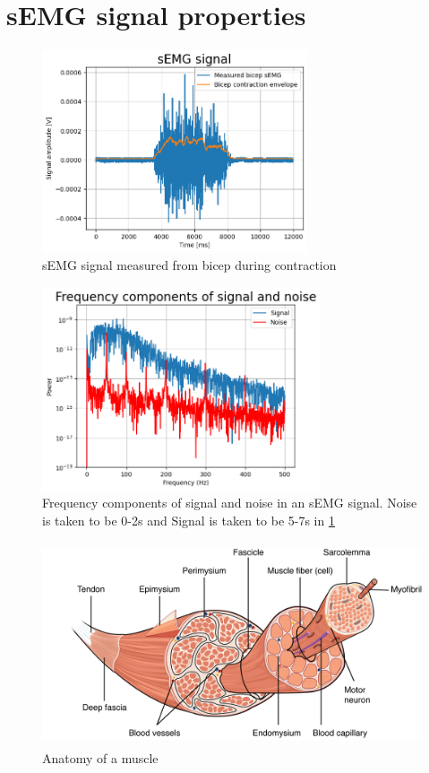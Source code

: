 \section{sEMG signal properties}

\begin{figure}[h!t]
	\begin{center}
		\includegraphics[height=60mm]{images/sEMG_signal_example.png}
	\end{center}
	\caption{sEMG signal measured from bicep during contraction}
	\label{fig:sEMG_signal_example}
\end{figure}

\begin{figure}[h!t]
	\begin{center}
		\includegraphics[height=60mm]{images/sEMG_fft_signalnoise_example.png}
	\end{center}
	\caption{Frequency components of signal and noise in an sEMG signal. 
    Noise is taken to be 0-2s and Signal is taken to be 5-7s in \ref{fig:sEMG_signal_example}}
	\label{fig:sEMG_fft_signalnoise_example}
\end{figure}

\begin{figure}[h!t]
	\begin{center}
		\includegraphics[height=60mm]{images/muscle_anatomy.png}
	\end{center}
	\caption{Anatomy of a muscle \cite{muscle_anatomy}}
	\label{fig:muscle_anatomy}
\end{figure}


